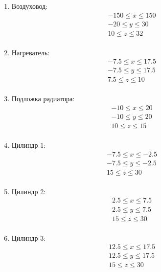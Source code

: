 \documentclass[a4paper,12pt]{extreport}
\numberwithin{equation}{chapter}
\begin{document}
\begin{enumerate}
	\item Воздуховод:
	      \[
		      \begin{aligned}
			       & -150 \leq x \leq 150 \\
			       & -20 \leq y \leq 30   \\
			       & 10 \leq z \leq 32    \\
		      \end{aligned}
	      \]
	      
	\item Нагреватель:
	      \[
		      \begin{aligned}
			       & -7.5 \leq x \leq 17.5 \\
			       & -7.5 \leq y \leq 17.5 \\
			       & 7.5 \leq z \leq 10    \\
		      \end{aligned}
	      \]
	      
	\item Подложка радиатора:
	      \[
		      \begin{aligned}
			       & -10 \leq x \leq 20 \\
			       & -10 \leq y \leq 20 \\
			       & 10 \leq z \leq 15  \\
		      \end{aligned}
	      \]
	      
	\item Цилиндр 1:
	      \[
		      \begin{aligned}
			       & -7.5 \leq x \leq -2.5 \\
			       & -7.5 \leq y \leq -2.5 \\
			       & 15 \leq z \leq 30     \\
		      \end{aligned}
	      \]
	      
	\item Цилиндр 2:
	      \[
		      \begin{aligned}
			       & 2.5 \leq x \leq 7.5 \\
			       & 2.5 \leq y \leq 7.5 \\
			       & 15 \leq z \leq 30   \\
		      \end{aligned}
	      \]
	      
	\item Цилиндр 3:
	      \[
		      \begin{aligned}
			       & 12.5 \leq x \leq 17.5 \\
			       & 12.5 \leq y \leq 17.5 \\
			       & 15 \leq z \leq 30     \\
		      \end{aligned}
	      \]
\end{enumerate}
\end{document}
